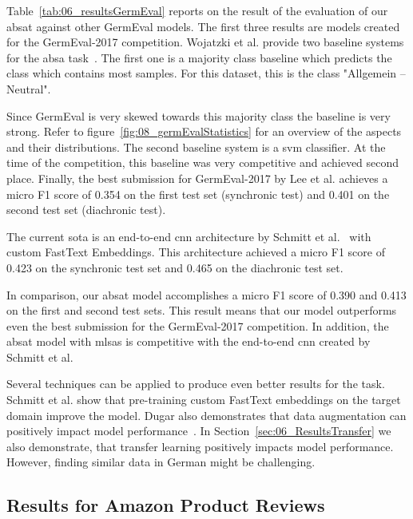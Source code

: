 Table~\ref{tab:06_resultsGermEval} reports on the result of the evaluation of our \gls{absat} against other GermEval models. The first three results are models created for the GermEval-2017 competition. Wojatzki et al. provide two baseline systems for the \gls{absa} task~\cite{Wojatzki2017}. The first one is a majority class baseline which predicts the class which contains most samples. For this dataset, this is the class "Allgemein -- Neutral". 
\medskip

Since GermEval is very skewed towards this majority class the baseline is very strong. Refer to figure~\ref{fig:08_germEvalStatistics} for an overview of the aspects and their distributions. The second baseline system is a \gls{svm} classifier. At the time of the competition, this baseline was very competitive and achieved second place. Finally, the best submission for GermEval-2017 by Lee et al. achieves a micro F1 score of 0.354 on the first test set {(synchronic test)} and 0.401 on the second test set {(diachronic test)}.
\medskip

The current \acrfull{sota} is an end-to-end \gls{cnn} architecture by Schmitt et al.~\cite{Schmitt2018} with custom FastText Embeddings. This architecture achieved a micro F1 score of 0.423 on the synchronic test set and 0.465 on the diachronic test set. 
\medskip

In comparison, our \gls{absat} model accomplishes a micro F1 score of 0.390 and 0.413 on the first and second test sets. This result means that our model outperforms even the best submission for the GermEval-2017 competition. In addition, the \gls{absat} model with \glspl{mlsa} is competitive with the end-to-end \gls{cnn} created by Schmitt et al.
\medskip

Several techniques can be applied to produce even better results for the task. Schmitt et al. show that pre-training custom FastText embeddings on the target domain improve the model. Dugar also demonstrates that data augmentation can positively impact model performance~\cite{Dugar2019}. 
\smallskip
In Section~\ref{sec:06_ResultsTransfer} we also demonstrate, that transfer learning positively impacts model performance. However, finding similar data in German might be challenging.

\subsection{Results for Amazon Product Reviews}
\label{sec:06_ResultsAmazon}

